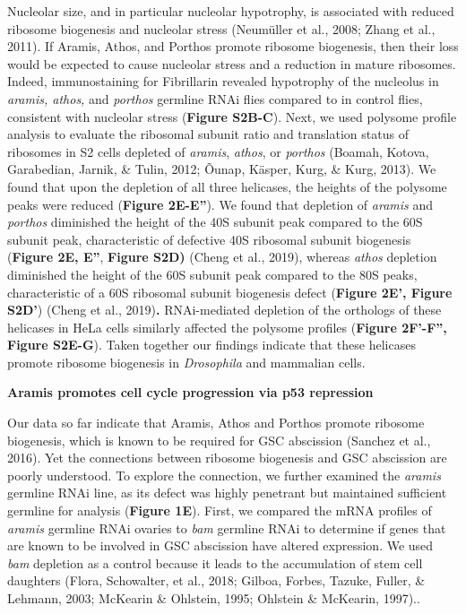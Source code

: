 \documentclass[12pt,twoside]{reedthesis}
\begin{document}
Nucleolar size, and in particular nucleolar hypotrophy, is associated
with reduced ribosome biogenesis and nucleolar stress (Neumüller et al., 2008; Zhang et al., 2011). If Aramis, Athos, and Porthos
promote ribosome biogenesis, then their loss would be expected to cause
nucleolar stress and a reduction in mature ribosomes. Indeed,
immunostaining for Fibrillarin revealed hypotrophy of the nucleolus in
\emph{aramis, athos,} and \emph{porthos} germline RNAi flies compared to in
control flies, consistent with nucleolar stress (\textbf{Figure S2B-C}).
Next, we used polysome profile analysis to evaluate the ribosomal
subunit ratio and translation status of ribosomes in S2 cells depleted
of \emph{aramis}, \emph{athos}, or \emph{porthos}
(Boamah, Kotova, Garabedian, Jarnik, \& Tulin, 2012; Õunap, Käsper, Kurg, \& Kurg, 2013).
We found that upon the depletion of all three helicases, the heights of
the polysome peaks were reduced (\textbf{Figure 2E-E''}). We found that
depletion of \emph{aramis} and \emph{porthos} diminished the height of the 40S
subunit peak compared to the 60S subunit peak, characteristic of
defective 40S ribosomal subunit biogenesis (\textbf{Figure 2E, E''}, \textbf{Figure
S2D)} (Cheng et al., 2019), whereas \emph{athos} depletion
diminished the height of the 60S subunit peak compared to the 80S peaks,
characteristic of a 60S ribosomal subunit biogenesis defect (\textbf{Figure
2E', Figure S2D'}) (Cheng et al., 2019)\textbf{.}
RNAi-mediated depletion of the orthologs of these helicases in HeLa
cells similarly affected the polysome profiles (\textbf{Figure 2F'-F'', Figure
S2E-G}). Taken together our findings indicate that these helicases
promote ribosome biogenesis in \emph{Drosophila} and mammalian cells.

\textbf{Aramis promotes cell cycle progression via p53 repression}

Our data so far indicate that Aramis, Athos and Porthos promote ribosome
biogenesis, which is known to be required for GSC abscission
(Sanchez et al., 2016). Yet the connections between ribosome biogenesis and
GSC abscission are poorly understood. To explore the connection, we
further examined the \emph{aramis} germline RNAi line, as its defect was
highly penetrant but maintained sufficient germline for analysis
(\textbf{Figure 1E}). First, we compared the mRNA profiles of \emph{aramis}
germline RNAi ovaries to \emph{bam} germline RNAi to determine if genes that
are known to be involved in GSC abscission have altered expression. We
used \emph{bam} depletion as a control because it leads to the accumulation
of stem cell daughters (Flora, Schowalter, et al., 2018; Gilboa, Forbes, Tazuke, Fuller, \& Lehmann, 2003; McKearin \& Ohlstein, 1995; Ohlstein \& McKearin, 1997)..
\end{document}
